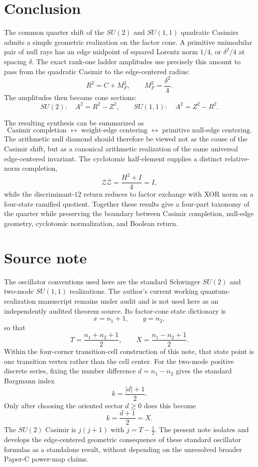 \documentclass[11pt]{article}
\theoremstyle{remark}
\begin{document}
\section{Conclusion}

The common quarter shift of the $SU(2)$ and $SU(1,1)$ quadratic Casimirs admits a simple geometric realization on the factor cone.  A primitive unimodular pair of null rays has an edge midpoint of squared Lorentz norm $1/4$, or $\delta^2/4$ at spacing $\delta$.  The exact rank-one ladder amplitudes use precisely this amount to pass from the quadratic Casimir to the edge-centered radius:
\[
\boxed{
R^2=C+M_F^2,
\qquad
M_F^2=\frac{\delta^2}{4}.
}
\]
The amplitudes then become cone sections:
\[
SU(2):\quad A^2=R^2-Z^2,
\qquad
SU(1,1):\quad A^2=Z^2-R^2.
\]

The resulting synthesis can be summarized as
\[
\boxed{
\text{Casimir completion}
\;\longleftrightarrow\;
\text{weight-edge centering}
\;\longleftrightarrow\;
\text{primitive null-edge centering}.
}
\]
The arithmetic null diamond should therefore be viewed not as the cause of the Casimir shift, but as a canonical arithmetic realization of the same universal edge-centered invariant.  The cyclotomic half-element supplies a distinct relative-norm completion,
\[
\mathcal Z\overline{\mathcal Z}=\frac{H^2+I}{4}=I,
\]
while the discriminant-$12$ return reduces to factor exchange with XOR norm on
a four-state ramified quotient.  Together these results give a four-part
taxonomy of the quarter while preserving the boundary between Casimir
completion, null-edge geometry, cyclotomic normalization, and Boolean return.

\section*{Source note}

The oscillator conventions used here are the standard Schwinger $SU(2)$ and two-mode $SU(1,1)$ realizations.  The author's current working quantum-realization manuscript remains under audit and is not used here as an independently audited theorem source.  Its factor-cone state dictionary is
\[
x=n_1+1,\qquad y=n_2,
\]
so that
\[
T=\frac{n_1+n_2+1}{2},\qquad
X=\frac{n_1-n_2+1}{2}.
\]
Within the four-corner transition-cell construction of this note, that state point is one transition vertex rather than the cell center.  For the two-mode positive discrete series, fixing the number difference $d=n_1-n_2$ gives the standard Bargmann index
\[
k=\frac{|d|+1}{2}.
\]
Only after choosing the oriented sector $d\ge0$ does this become
\[
k=\frac{d+1}{2}=X.
\]
The $SU(2)$ Casimir is $j(j+1)$ with $j=T-\tfrac12$.  The present note isolates and develops the edge-centered geometric consequence of these standard oscillator formulas as a standalone result, without depending on the unresolved broader Paper-C power-map claims.
\end{document}
